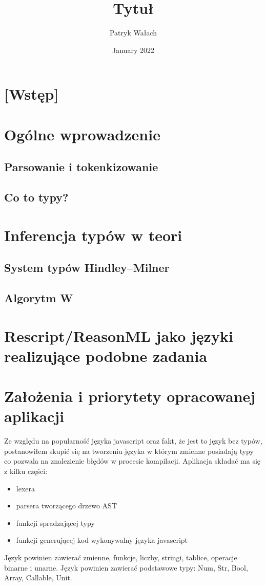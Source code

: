 \documentclass{article}
\title{Tytuł}
\author{Patryk Wałach}
\date{January 2022}
\begin{document}
\maketitle

\section{[Wstęp]}

\section{Ogólne wprowadzenie}
\subsection{Parsowanie i tokenkizowanie}
\subsection{Co to typy?}
\section{Inferencja typów w teori}
\subsection{System typów Hindley–Milner}
\subsection{Algorytm W}
\section{Rescript/ReasonML jako języki realizujące podobne zadania}
\section{Założenia i priorytety opracowanej aplikacji}
Ze względu na popularność języka javascript oraz fakt, że jest to język bez typów, postanowiłem skupić się na tworzeniu języka w którym zmienne posiadają typy co pozwala na znalezienie błędów w procesie kompilacji. Aplikacja składać ma się z kilku części:
\begin{itemize}
    \item lexera
    \item parsera tworzącego drzewo AST
    \item funkcji spradzającej typy
    \item funkcji generującej kod wykonywalny języka javascript
\end{itemize}
Język powinien zawierać zmienne, funkcje, liczby, stringi, tablice, operacje binarne i unarne.
Język powinien zawierać podstawowe typy: Num, Str, Bool, Array, Callable, Unit.
\end{document}
